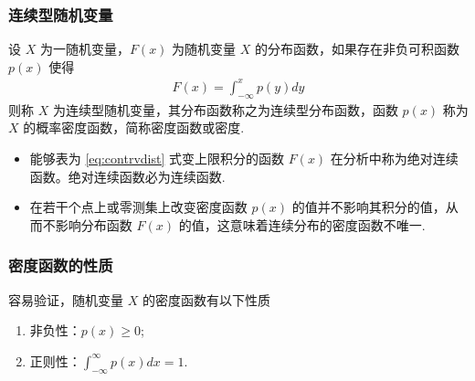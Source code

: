 



\begin{frame}
	\frametitle{连续型随机变量}
	\begin{defi}[连续型随机变量] 设 $X$ 为一随机变量，$F (x)$ 为随机变量 $X$ 的分布函数，如果存在非负可积函数 $p (x)$ 使得
		\begin{eqnarray}\label{eq:contrvdist}
			F(x)=\int_{-\infty}^xp(y)dy
		\end{eqnarray}
		则称 $X$ 为连续型随机变量，其分布函数称之为连续型分布函数，函数 $p (x)$ 称为 $X$ 的概率密度函数，简称密度函数或密度.
	\end{defi}
	\pause
	\begin{rmk}
		\begin{itemize}[<+-|alert@+>]
			\item 能够表为 \eqref{eq:contrvdist} 式变上限积分的函数 $F (x)$ 在分析中称为绝对连续函数。绝对连续函数必为连续函数.
			\item 在若干个点上或零测集上改变密度函数 $p (x)$ 的值并不影响其积分的值，从而不影响分布函数 $F (x)$ 的值，这意味着连续分布的密度函数不唯一.
		\end{itemize}
	\end{rmk}

\end{frame}

\begin{frame}
	\frametitle{密度函数的性质}
	容易验证，随机变量 $X$ 的密度函数有以下性质
	\begin{enumerate}[<+-|alert@+>]
		\item 非负性：$p (x)\ge 0$;
		\item 正则性：$\int_{-\infty}^\infty p (x) dx=1$.
	\end{enumerate}

\end{frame}


